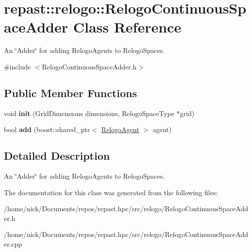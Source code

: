 \hypertarget{classrepast_1_1relogo_1_1_relogo_continuous_space_adder}{\section{repast\-:\-:relogo\-:\-:Relogo\-Continuous\-Space\-Adder Class Reference}
\label{classrepast_1_1relogo_1_1_relogo_continuous_space_adder}
}


An \char`\"{}\-Adder\char`\"{} for adding Relogo\-Agents to Relogo\-Spaces.  




{\ttfamily \#include $<$Relogo\-Continuous\-Space\-Adder.\-h$>$}

\subsection*{Public Member Functions}
\begin{DoxyCompactItemize}
\item 
\hypertarget{classrepast_1_1relogo_1_1_relogo_continuous_space_adder_ae3d1f3a8f4b28aaf125a2f958cd9d93d}{void {\bfseries init} (Grid\-Dimensions dimensions, Relogo\-Space\-Type $\ast$grid)}\label{classrepast_1_1relogo_1_1_relogo_continuous_space_adder_ae3d1f3a8f4b28aaf125a2f958cd9d93d}

\item 
\hypertarget{classrepast_1_1relogo_1_1_relogo_continuous_space_adder_a1f01bacbabf806b87c75c3a2c0631b48}{bool {\bfseries add} (boost\-::shared\-\_\-ptr$<$ \hyperlink{classrepast_1_1relogo_1_1_relogo_agent}{Relogo\-Agent} $>$ agent)}\label{classrepast_1_1relogo_1_1_relogo_continuous_space_adder_a1f01bacbabf806b87c75c3a2c0631b48}

\end{DoxyCompactItemize}


\subsection{Detailed Description}
An \char`\"{}\-Adder\char`\"{} for adding Relogo\-Agents to Relogo\-Spaces. 

The documentation for this class was generated from the following files\-:\begin{DoxyCompactItemize}
\item 
/home/nick/\-Documents/repos/repast.\-hpc/src/relogo/Relogo\-Continuous\-Space\-Adder.\-h\item 
/home/nick/\-Documents/repos/repast.\-hpc/src/relogo/Relogo\-Continuous\-Space\-Adder.\-cpp\end{DoxyCompactItemize}
